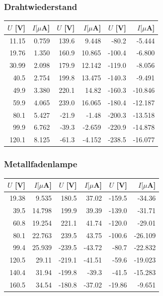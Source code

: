 \documentclass[12pt,a4paper]{article}
\begin{document}
\subsubsection*{Drahtwiederstand}
\begin{tabular}{|r|r|r|r|r|r|}
\hline
$U$ [V]&$I [\mu $A]&$U$ [V]&$I [\mu $A]&$U$ [V]&$I [\mu $A]\\
\hline
11.15&0.759&139.6&9.448&-80.2&-5.444\\
19.76&1.350&160.9&10.865&-100.4&-6.800\\
30.99&2.098&179.9&12.142&-119.0&-8.056\\
40.5&2.754&199.8&13.475&-140.3&-9.491\\
49.9&3.380&220.1&14.82&-160.3&-10.846\\
59.9&4.065&239.0&16.065&-180.4&-12.187\\
80.1&5.427&-21.9&-1.48&-200.3&-13.518\\
99.9&6.762&-39.3&-2.659&-220.9&-14.878\\
120.1&8.125&-61.3&-4.152&-238.5&-16.077\\
\hline
\end{tabular}

\subsubsection*{Metallfadenlampe}
\begin{tabular}{|r|r|r|r|r|r|}
\hline
$U$ [V]&$I [\mu $A]&$U$ [V]&$I [\mu $A]&$U$ [V]&$I [\mu $A]\\
\hline
19.38&9.535&180.5&37.02&-159.5&-34.36\\
39.5&14.798&199.9&39.39&-139.0&-31.71\\
60.8&19.254&221.1&41.74&-120.0&-29.01\\
80.1&22.763&239.5&43.75&-100.6&-26.109\\
99.4&25.939&-239.5&-43.72&-80.7&-22.832\\
120.5&29.11&-219.1&-41.51&-59.6&-19.023\\
140.4&31.94&-199.8&-39.3&-41.5&-15.283\\
160.5&34.54&-180.8&-37.02&-19.86&-9.651\\
\hline
\end{tabular}
\end{document}
